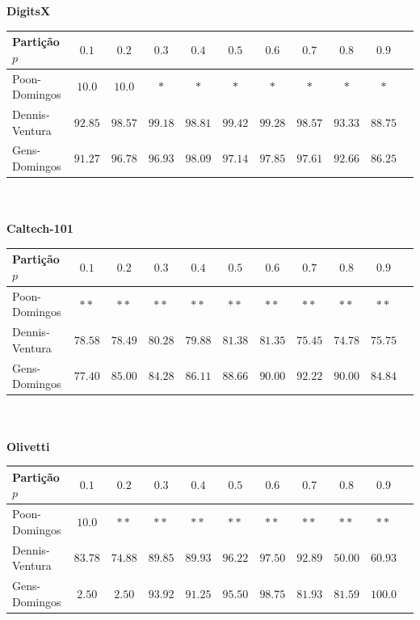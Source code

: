 \documentclass[12pt]{article}
\theoremstyle{plain}
\numberwithin{equation}{section}
\begin{document}
\begin{table}[H]
  \centering\textbf{DigitsX}\vspace{0.25cm}
  \begin{tabular}{l|cccccccccc}
    Partição $p$ & $0.1$ & $0.2$ & $0.3$ & $0.4$ & $0.5$ & $0.6$ & $0.7$ & $0.8$ & $0.9$\\
    \hline
    Poon-Domingos & $10.0$ & $10.0$ & $\ast$ & $\ast$ & $\ast$ & $\ast$ & $\ast$ & $\ast$ & $\ast$\\
    Dennis-Ventura & $92.85$ & $98.57$ & $99.18$ & $98.81$ & $99.42$ & $99.28$ & $98.57$ & $93.33$ & $88.75$\\
    Gens-Domingos & $91.27$ & $96.78$ & $96.93$ & $98.09$ & $97.14$ & $97.85$ & $97.61$ & $92.66$ & $86.25$\\
  \end{tabular}\\~\\
  \textbf{Caltech-101}\vspace{0.25cm}\\
  \begin{tabular}{l|cccccccccc}
    Partição $p$ & $0.1$ & $0.2$ & $0.3$ & $0.4$ & $0.5$ & $0.6$ & $0.7$ & $0.8$ & $0.9$\\
    \hline
    Poon-Domingos & $\ast\ast$ & $\ast\ast$ & $\ast\ast$ & $\ast\ast$ & $\ast\ast$ & $\ast\ast$ & $\ast\ast$ & $\ast\ast$ & $\ast\ast$\\
    Dennis-Ventura & $78.58$ & $78.49$ & $80.28$ & $79.88$ & $81.38$ & $81.35$ & $75.45$ & $74.78$ & $75.75$\\
    Gens-Domingos & $77.40$ & $85.00$ & $84.28$ & $86.11$ & $88.66$ & $90.00$ & $92.22$ & $90.00$ & $84.84$\\
  \end{tabular}\\~\\
  \textbf{Olivetti}\vspace{0.25cm}\\
  \begin{tabular}{l|cccccccccc}
    Partição $p$ & $0.1$ & $0.2$ & $0.3$ & $0.4$ & $0.5$ & $0.6$ & $0.7$ & $0.8$ & $0.9$\\
    \hline
    Poon-Domingos & $10.0$ & $\ast\ast$ & $\ast\ast$ & $\ast\ast$ & $\ast\ast$ & $\ast\ast$ & $\ast\ast$ & $\ast\ast$ & $\ast\ast$\\
    Dennis-Ventura & $83.78$ & $74.88$ & $89.85$ & $89.93$ & $96.22$ & $97.50$ & $92.89$ & $50.00$ & $60.93$\\
    Gens-Domingos & $2.50$ & $2.50$ & $93.92$ & $91.25$ & $95.50$ & $98.75$ & $81.93$ & $81.59$ & $100.0$\\

\end{tabular}
\end{table}
\end{document}
